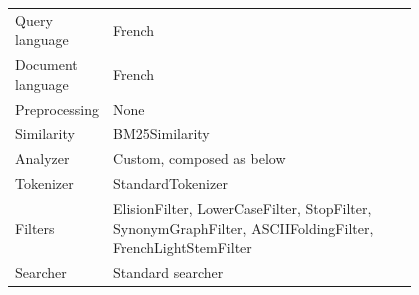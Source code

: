 \begin{table}[h!]
    \centering
    \begin{tabular}{l p{0.8\linewidth}}
    Query language & French\\
    Document language & French\\
    Preprocessing & None\\
    Similarity & BM25Similarity\\
    Analyzer & Custom, composed as below\\
    Tokenizer & StandardTokenizer\\
    Filters & ElisionFilter, LowerCaseFilter, StopFilter, SynonymGraphFilter, ASCIIFoldingFilter, FrenchLightStemFilter\\
    Searcher & Standard searcher
    \end{tabular}
\end{table}


